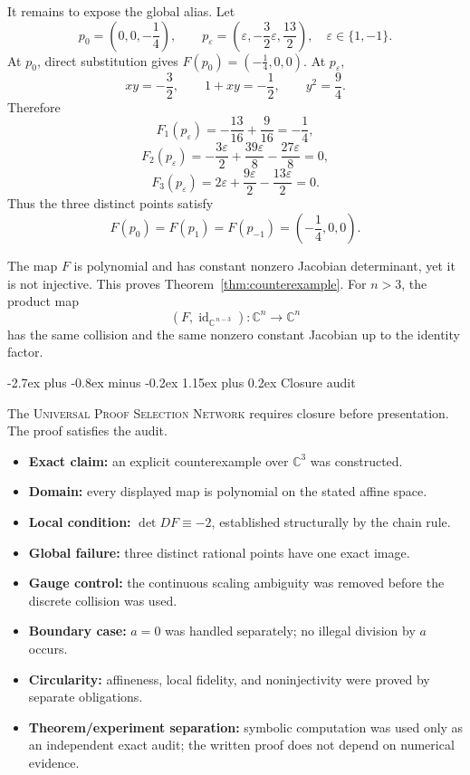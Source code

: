 \documentclass[11pt,letterpaper]{article}
\makeatletter
\newcommand{\C}{\mathbb{C}}
\newcommand{\id}{\operatorname{id}}
\newcommand{\UPSN}{\textsc{Universal Proof Selection Network}}
\theoremstyle{jgpplain}
\renewcommand{\section}{\@startsection{section}{1}{0pt}%
  {-2.7ex plus -0.8ex minus -0.2ex}%
  {1.15ex plus 0.2ex}%
  {\normalfont\sffamily\Large\bfseries\color{JGPBlue}}}
\makeatother
\begin{document}
It remains to expose the global alias. Let
\[
p_0=\left(0,0,-\frac14\right),
\qquad
p_\varepsilon=
\left(\varepsilon,-\frac32\varepsilon,\frac{13}{2}\right),
\quad \varepsilon\in\{1,-1\}.
\]
At \(p_0\), direct substitution gives
\(F(p_0)=(-\tfrac14,0,0)\). At \(p_\varepsilon\),
\[
xy=-\frac32,\qquad 1+xy=-\frac12,\qquad y^2=\frac94.
\]
Therefore
\[
F_1(p_\varepsilon)
=-\frac{13}{16}+\frac{9}{16}
=-\frac14,
\]
\[
F_2(p_\varepsilon)
=-\frac{3\varepsilon}{2}
 +\frac{39\varepsilon}{8}
-\frac{27\varepsilon}{8}
=0,
\]
\[
F_3(p_\varepsilon)
=2\varepsilon+\frac{9\varepsilon}{2}
-\frac{13\varepsilon}{2}
=0.
\]
Thus the three distinct points satisfy
\[
F(p_0)=F(p_1)=F(p_{-1})
=\left(-\frac14,0,0\right).
\]

The map \(F\) is polynomial and has constant nonzero Jacobian determinant, yet
it is not injective. This proves Theorem~\ref{thm:counterexample}. For \(n>3\),
the product map
\[
(F,\id_{\C^{\,n-3}}):\C^n\longrightarrow\C^n
\]
has the same collision and the same nonzero constant Jacobian up to the
identity factor.

\section{Closure audit}

The \UPSN{} requires closure before presentation. The proof satisfies the
audit.

\begin{auditbox}
\begin{itemize}
  \item \textbf{Exact claim:} an explicit counterexample over \(\C^3\) was
        constructed.
  \item \textbf{Domain:} every displayed map is polynomial on the stated
        affine space.
  \item \textbf{Local condition:} \(\det DF\equiv-2\), established
        structurally by the chain rule.
  \item \textbf{Global failure:} three distinct rational points have one exact
        image.
  \item \textbf{Gauge control:} the continuous scaling ambiguity was removed
        before the discrete collision was used.
  \item \textbf{Boundary case:} \(a=0\) was handled separately; no illegal
        division by \(a\) occurs.
  \item \textbf{Circularity:} affineness, local fidelity, and noninjectivity
        were proved by separate obligations.
  \item \textbf{Theorem/experiment separation:} symbolic computation was used
        only as an independent exact audit; the written proof does not depend
        on numerical evidence.
\end{itemize}
\end{auditbox}
\end{document}
